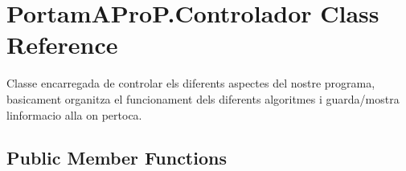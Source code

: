 \hypertarget{class_portam_a_pro_p_1_1_controlador}{}\section{Portam\+A\+Pro\+P.\+Controlador Class Reference}
\label{class_portam_a_pro_p_1_1_controlador}


Classe encarregada de controlar els diferents aspectes del nostre programa, basicament organitza el funcionament dels diferents algoritmes i guarda/mostra l\textquotesingle{}informacio alla on pertoca.  


\subsection*{Public Member Functions}
